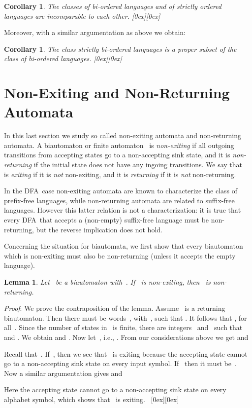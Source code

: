 \documentclass[submission]{eptcs}
\newcommand{\dfa}{\textrm{DFA}}
\newcommand*{\qed}{\raisebox{0.5ex}[0ex][0ex]{\framebox[1ex][l]{}}}
\newtheorem{lemma}[theorem]{Lemma}
\newtheorem{corollary}[theorem]{Corollary}
\newenvironment{proof}{\par\noindent
  {\rmfamily\itshape\mdseries Proof\/}:\hspace{\labelsep}\ignorespaces}{\mbox{}\nolinebreak\hfill~{\qed}
  \medbreak
}
\begin{document}
\begin{corollary}
  The classes of bi-ordered languages and of strictly ordered
  languages are incomparable to each other.  \hfill \qed
\end{corollary}

Moreover, with a similar argumentation as above we obtain:

\begin{corollary}
  The class strictly bi-ordered languages is a proper subset of the
  class of bi-ordered languages.  \hfill \qed
\end{corollary}

\section{Non-Exiting and Non-Returning Automata}
\label{sec:non-exiting-non-returning}

In this last section we study so called non-exiting automata and
non-returning automata.  
A biautomaton or finite automaton~ is \emph{non-exiting} if all
outgoing transitions from accepting states go to a non-accepting sink
state, and it is \emph{non-returning} if the initial state does not
have any ingoing transitions.  We say that~ is \emph{exiting} if it
is \emph{not} non-exiting, and it is \emph{returning} if it is
\emph{not} non-returning.

In the \dfa\ case non-exiting automata are known to characterize the
class of prefix-free languages, while non-returning automata are
related to suffix-free languages.  However this latter relation is not
a characterization: it is true that every \dfa\ that accepts a
(non-empty) suffix-free language must be non-returning, but the
reverse implication does not hold.

Concerning the situation for biautomata, we first show that every
biautomaton which is non-exiting must also be non-returning (unless it
accepts the empty language).

\begin{lemma}\label{lem:non-exiting-implies-non-returning}
  Let~ be a biautomaton with~.  If~ is
  non-exiting, then~ is non-returning.
\end{lemma}

\begin{proof}
  We prove the contraposition of the lemma.
  Assume~ is a returning biautomaton.
  Then there must be words~, with~,
  such that .  It follows that , for all~.
  Since the number of states in~ is finite, there are
  integers~ and~ such that  and .  We obtain
   and .
Now let~, i.e., .  From our
  considerations above we get 
  and

Recall that~.  If~, then we see
  that~ is exiting because the accepting state  cannot go to a non-accepting sink state
  on every input symbol.  If~ then it must be~.  Now a similar argumentation gives  and

Here the accepting state  cannot
  go to a non-accepting sink state on every alphabet symbol, which
  shows that~ is exiting.
\end{proof}
\end{document}
